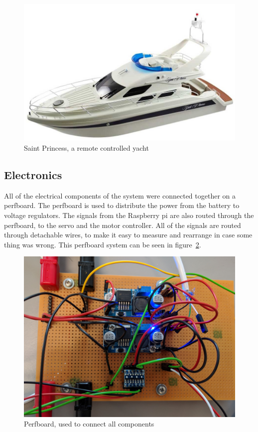 \begin{figure}[h]
\centering
\includegraphics[width=0.7\linewidth]{../Appendix/Project/Dokumentation/Images/Design/saint_princess}
\caption{Saint Princess, a remote controlled yacht\cite{saint_princess}}
\label{fig:saintprincess}
\end{figure}

\subsection{Electronics}
All of the electrical components of the system were connected together on a perfboard. The perfboard is used to distribute the power from the battery to voltage regulators. The signals from the Raspberry pi are also routed through the perfboard, to the servo and the motor controller. All of the signals are routed through detachable wires, to make it easy to measure and rearrange in case some thing was wrong. This perfboard system can be seen in figure~\ref{fig:integration}. 

\begin{figure}[h]
\centering
\includegraphics[width=0.7\linewidth]{../Appendix/Project/Dokumentation/Images/Implementation/integration}
\caption{Perfboard, used to connect all components}
\label{fig:integration}
\end{figure}

